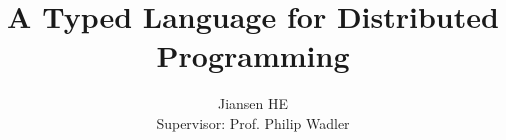 \documentclass[coverpage]{myproposal}
\begin{document}
\title{A Typed Language for Distributed Programming}
\author{ Jiansen HE \\  Supervisor: Prof. Philip Wadler}
\maketitle
\tableofcontents







\appendix





\end{document}
